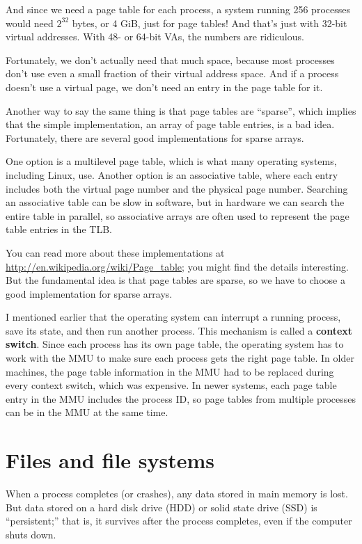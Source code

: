 \documentclass[12pt]{book}
\begin{document}
{And since we need a page table for each process, a system running
256 processes would need $2^{32}$ bytes, or 4 GiB, just for page tables!
And that's just with 32-bit virtual addresses.  With 48- or 64-bit
VAs, the numbers are ridiculous.

Fortunately, we don't actually need that much space, because
most processes don't use even a small fraction of their
virtual address space.  And if a process doesn't use a virtual
page, we don't need an entry in the page table for it.

Another way to say the same thing is that page tables are ``sparse'',
which implies that the simple implementation, an array of page
table entries, is a bad idea.  Fortunately, there are several
good implementations for sparse arrays.

One option is a multilevel page table, which is what many operating
systems, including Linux, use.  Another option is an associative table, where each entry includes both the virtual page number and the physical page number.  Searching an associative table can be slow in software, but in hardware we
can search the entire table in parallel, so associative arrays are
often used to represent the page table entries in the TLB.

You can read more about these implementations at
\url{http://en.wikipedia.org/wiki/Page_table}; you might find the
details interesting.  But the fundamental idea is that page tables are
sparse, so we have to choose a good implementation for sparse arrays.

I mentioned earlier that the operating system can interrupt a running
process, save its state, and then run another process.  This mechanism
is called a {\bf context switch}.  Since each process has its own
page table, the operating system has to work with the MMU to make
sure each process gets the right page table.  In older machines,
the page table information in the MMU had to be replaced during every
context switch, which was expensive.  In newer systems, each page
table entry in the MMU includes the process ID, so page tables from
multiple processes can be in the MMU at the same time.



\chapter{Files and file systems}

When a process completes (or crashes), any data stored in main
memory is lost.  But data stored on a hard disk drive (HDD) or
solid state drive (SSD) is ``persistent;'' that is, it survives
after the process completes, even if the computer shuts down.

}
\end{document}
